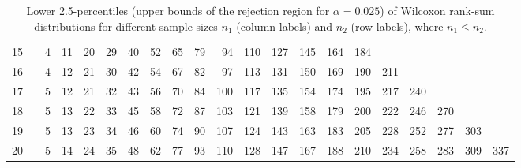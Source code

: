 \begin{table}[ht]
\begin{tabular}{@{}r@{~~}r@{~~}r@{~~}r@{~~}r@{~~}r@{~~}r@{~~}r@{~~}r@{~~}r@{~~}r@{~~}r@{~~}r@{~~}r@{~~}r@{~~}r@{~~}r@{~~}r@{~~}r@{~~}r@{~~}r@{}}
  15 &  & 4 & 11 & 20 & 29 & 40 & 52 & 65 & 79 & 94 & 110 & 127 & 145 & 164 & 184 &  &  &  &  &  \\ 
  16 &  & 4 & 12 & 21 & 30 & 42 & 54 & 67 & 82 & 97 & 113 & 131 & 150 & 169 & 190 & 211 &  &  &  &  \\ 
  17 &  & 5 & 12 & 21 & 32 & 43 & 56 & 70 & 84 & 100 & 117 & 135 & 154 & 174 & 195 & 217 & 240 &  &  &  \\ 
  18 &  & 5 & 13 & 22 & 33 & 45 & 58 & 72 & 87 & 103 & 121 & 139 & 158 & 179 & 200 & 222 & 246 & 270 &  &  \\ 
  19 &  & 5 & 13 & 23 & 34 & 46 & 60 & 74 & 90 & 107 & 124 & 143 & 163 & 183 & 205 & 228 & 252 & 277 & 303 &  \\ 
  20 &  & 5 & 14 & 24 & 35 & 48 & 62 & 77 & 93 & 110 & 128 & 147 & 167 & 188 & 210 & 234 & 258 & 283 & 309 & 337 \\ 
   \hline
\end{tabular}
\caption{Lower 2.5-percentiles (upper bounds of the rejection region for $\alpha=0.025$) of Wilcoxon rank-sum distributions for different sample sizes $n_1$ (column labels) and $n_2$ (row labels), where ${n_1}\leq{n_2}$.}
\label{tab:w0.025}
\end{table}

